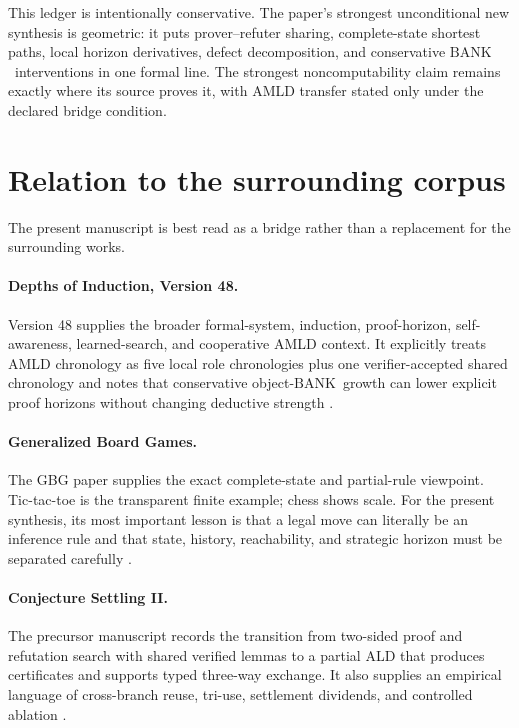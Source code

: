 \documentclass[11pt]{article}
\theoremstyle{remark}
\newcommand{\BANK}{\ensuremath{\mathrm{BANK}}}
\begin{document}
This ledger is intentionally conservative. The paper's strongest unconditional new synthesis is geometric: it puts prover--refuter sharing, complete-state shortest paths, local horizon derivatives, defect decomposition, and conservative \BANK\ interventions in one formal line. The strongest noncomputability claim remains exactly where its source proves it, with AMLD transfer stated only under the declared bridge condition.

\section{Relation to the surrounding corpus}

The present manuscript is best read as a bridge rather than a replacement for the surrounding works.

\paragraph{Depths of Induction, Version 48.}
Version 48 supplies the broader formal-system, induction, proof-horizon, self-awareness, learned-search, and cooperative AMLD context. It explicitly treats AMLD chronology as five local role chronologies plus one verifier-accepted shared chronology and notes that conservative object-\BANK\ growth can lower explicit proof horizons without changing deductive strength \cite{TennesonDepths48}.

\paragraph{Generalized Board Games.}
The GBG paper supplies the exact complete-state and partial-rule viewpoint. Tic-tac-toe is the transparent finite example; chess shows scale. For the present synthesis, its most important lesson is that a legal move can literally be an inference rule and that state, history, reachability, and strategic horizon must be separated carefully \cite{TennesonGBG}.

\paragraph{Conjecture Settling II.}
The precursor manuscript records the transition from two-sided proof and refutation search with shared verified lemmas to a partial ALD that produces certificates and supports typed three-way exchange. It also supplies an empirical language of cross-branch reuse, tri-use, settlement dividends, and controlled ablation \cite{TennesonCSII}.
\end{document}
